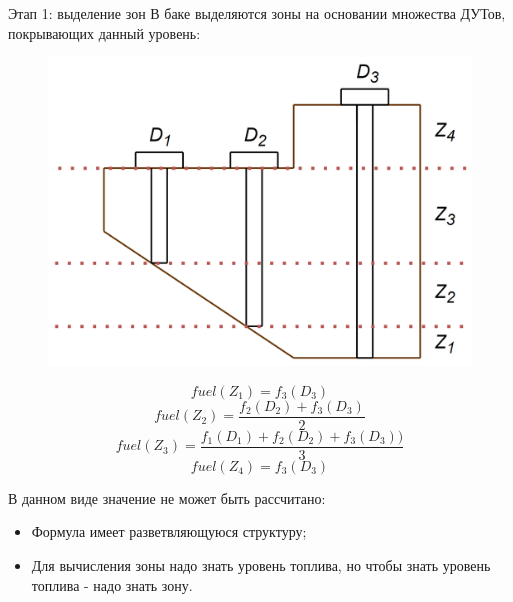 \documentclass[usenames,dvipsnames,11pt]{beamer}
\begin{document}
\begin{frame}{Этап 1: выделение зон}
	В баке выделяются зоны на основании множества ДУТов, покрывающих данный уровень:
	\\
	\begin{minipage}[h]{0.45\linewidth}
		\begin{figure}
				\centering
				\includegraphics[width=1\linewidth]{graphics/screenshot006}
		\end{figure}
	\end{minipage}
	\hfill
	\begin{minipage}[h]{0.5\linewidth}
		$$fuel(Z_1) = f_3(D_3)$$
		$$fuel(Z_2) = \frac{f_2 (D_2)+f_3 (D_3)}{2}$$
		$$fuel(Z_3) = \frac{f_1 (D_1)+f_2(D_2)+f_3(D_3))}{3}$$
		$$fuel(Z_4)=  f_3 (D_3 )$$
	\end{minipage}
	\bigbreak
	В данном виде значение не может быть рассчитано:
	\begin{itemize}
		\item Формула имеет разветвляющуюся структуру;
		\item Для вычисления зоны надо знать уровень топлива, но чтобы знать уровень топлива - надо знать зону.
	\end{itemize}
\end{frame}
\end{document}
